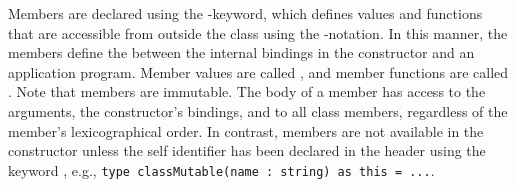 \documentclass[fsharpNotes.tex]{subfiles}
\begin{document}
Members are declared using the -keyword, which defines values and functions that are accessible from outside the class using the -notation. In this manner, the members define the  between the internal bindings in the constructor and an application program. Member values are called , and
member functions are called . Note that members are immutable.
The body of a member has access to the arguments, the constructor's bindings, and to all class members, regardless of the member's lexicographical order. 
In contrast, members are not available in the constructor unless the self identifier has been declared in the header using the keyword , e.g., \lstinline{type classMutable(name : string) as this = ...}.
\end{document}
